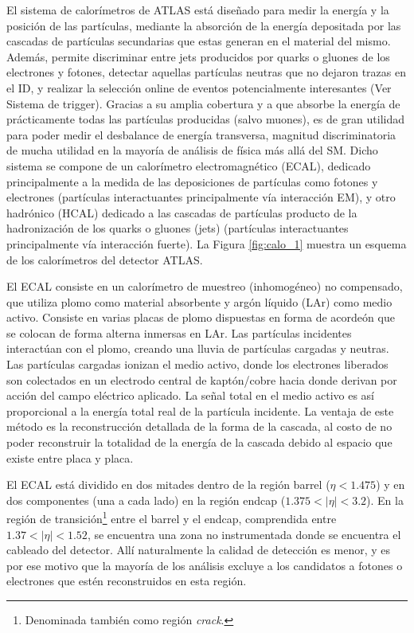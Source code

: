 El sistema de calorímetros de ATLAS está diseñado para medir la energía y la posición de las partículas, mediante la absorción de la energía depositada por las cascadas de partículas secundarias que estas generan en el material del mismo. Además, permite discriminar entre jets producidos por quarks o gluones de los electrones y fotones, detectar aquellas partículas neutras que no dejaron trazas en el ID, y realizar la selección online de eventos potencialmente interesantes (Ver Sistema de trigger). Gracias a su amplia cobertura y a que absorbe la energía de prácticamente todas las partículas producidas (salvo muones), es de gran utilidad para poder medir el desbalance de energía transversa, magnitud discriminatoria de mucha utilidad en la mayoría de análisis de física más allá del SM. Dicho sistema se compone de un calorímetro electromagnético (ECAL), dedicado principalmente a la medida de las deposiciones de partículas como fotones y electrones (partículas interactuantes principalmente vía interacción EM), y otro hadrónico (HCAL) dedicado a las cascadas de partículas producto de la hadronización de los quarks o gluones (jets) (partículas interactuantes principalmente vía interacción fuerte). La Figura \ref{fig:calo_1} muestra un esquema de los calorímetros del detector ATLAS.



El ECAL consiste en un calorímetro de muestreo (inhomogéneo) no compensado, que utiliza plomo como material absorbente y argón líquido (LAr) como medio activo. Consiste en varias placas de plomo dispuestas en forma de acordeón que se colocan de forma alterna inmersas en LAr. Las partículas incidentes interactúan con el plomo, creando una lluvia de partículas cargadas y neutras. Las partículas cargadas ionizan el medio activo, donde los electrones liberados son colectados en un electrodo central de kaptón/cobre hacia donde derivan por acción del campo eléctrico aplicado. La señal total en el medio activo es así proporcional a la energía total real de la partícula incidente. La ventaja de este método es la reconstrucción detallada de la forma de la cascada, al costo de no poder reconstruir la totalidad de la energía de la cascada debido al espacio que existe entre placa y placa.


El ECAL está dividido en dos mitades dentro de la región barrel ($\eta < 1.475$) y en dos componentes (una a cada lado) en la región endcap ($1.375 < |\eta| < 3.2$). 
En la región de transición\footnote{Denominada también como región \textit{crack}.} entre el barrel y el endcap, comprendida entre $1.37 < |\eta| < 1.52$, se encuentra una zona no instrumentada donde se encuentra el cableado del detector. 
Allí naturalmente la calidad de detección es menor, y es por ese motivo que la mayoría de los análisis excluye a los candidatos a fotones o electrones que estén reconstruidos en esta región.

